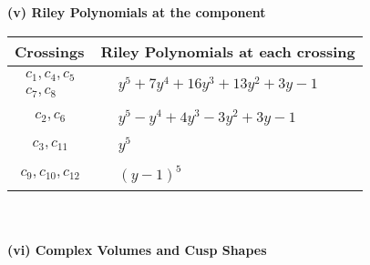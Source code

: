 \documentclass[1p]{elsarticle_modified}
\theoremstyle{definition}
\begin{document}
\newpage\renewcommand{\arraystretch}{1}
\flushleft \textbf{(v) Riley Polynomials at the component}\newline \\
\begin{tabular}{m{50pt}|m{274pt}}
Crossings & \hspace{64pt}Riley Polynomials at each crossing \\
\hline $$\begin{aligned}c_{1},c_{4},c_{5}\\c_{7},c_{8}\end{aligned}$$&$\begin{aligned}
&y^5+7 y^4+16 y^3+13 y^2+3 y-1
\end{aligned}$\\
\hline $$\begin{aligned}c_{2},c_{6}\end{aligned}$$&$\begin{aligned}
&y^5- y^4+4 y^3-3 y^2+3 y-1
\end{aligned}$\\
\hline $$\begin{aligned}c_{3},c_{11}\end{aligned}$$&$\begin{aligned}
&y^5
\end{aligned}$\\
\hline $$\begin{aligned}c_{9},c_{10},c_{12}\end{aligned}$$&$\begin{aligned}
&(y-1)^5
\end{aligned}$\\
\hline
\end{tabular}\\~\\
\newpage\flushleft \textbf{(vi) Complex Volumes and Cusp Shapes}
\end{document}
